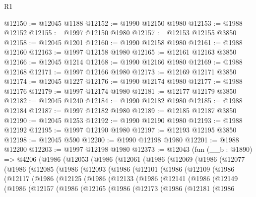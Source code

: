\begin{lexlean}{R1}
\begin{coremodule}
@12150 := @12045 @1188
@12152 := @1990 @12150 @1980
@12153 := @1988 @12152
@12155 := @1997 @12150 @1980
@12157 := @12153 @12155 @3850
@12158 := @12045 @1201
@12160 := @1990 @12158 @1980
@12161 := @1988 @12160
@12163 := @1997 @12158 @1980
@12165 := @12161 @12163 @3850
@12166 := @12045 @1214
@12168 := @1990 @12166 @1980
@12169 := @1988 @12168
@12171 := @1997 @12166 @1980
@12173 := @12169 @12171 @3850
@12174 := @12045 @1227
@12176 := @1990 @12174 @1980
@12177 := @1988 @12176
@12179 := @1997 @12174 @1980
@12181 := @12177 @12179 @3850
@12182 := @12045 @1240
@12184 := @1990 @12182 @1980
@12185 := @1988 @12184
@12187 := @1997 @12182 @1980
@12189 := @12185 @12187 @3850
@12190 := @12045 @1253
@12192 := @1990 @12190 @1980
@12193 := @1988 @12192
@12195 := @1997 @12190 @1980
@12197 := @12193 @12195 @3850
@12198 := @12045 @590
@12200 := @1990 @12198 @1980
@12201 := @1988 @12200
@12203 := @1997 @12198 @1980
@12373 := @12043
    (fun (__b : @1890) =>
    @4206
      (@1986
        (@12053
          (@1986
            (@12061
              (@1986
                (@12069
                  (@1986
                    (@12077
                      (@1986
                        (@12085
                          (@1986
                            (@12093
                              (@1986
                                (@12101
                                  (@1986
                                    (@12109
                                      (@1986
                                        (@12117
                                          (@1986
                                            (@12125
                                              (@1986
                                                (@12133
                                                  (@1986
                                                    (@12141
                                                      (@1986
                                                        (@12149
                                                          (@1986
                                                            (@12157
                                                              (@1986
                                                                (@12165
                                                                  (@1986
                                                                    (@12173
                                                                      (@1986
                                                                        (@12181
                                                                          (@1986

\end{coremodule}
\end{lexlean}
